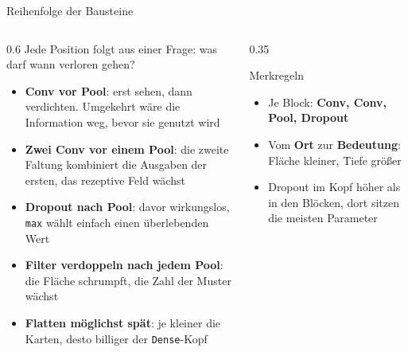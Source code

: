 \begin{frame}{Reihenfolge der Bausteine}
\footnotesize
\begin{columns}
\begin{column}{0.6\linewidth}
Jede Position folgt aus einer Frage: was darf wann verloren gehen?
\begin{itemize}
  \item \textbf{Conv vor Pool}: erst sehen, dann verdichten. Umgekehrt wäre die Information weg, bevor sie genutzt wird
  \item \textbf{Zwei Conv vor einem Pool}: die zweite Faltung kombiniert die Ausgaben der ersten, das rezeptive Feld wächst
  \item \textbf{Dropout nach Pool}: davor wirkungslos, \texttt{max} wählt einfach einen überlebenden Wert
  \item \textbf{Filter verdoppeln nach jedem Pool}: die Fläche schrumpft, die Zahl der Muster wächst
  \item \textbf{Flatten möglichst spät}: je kleiner die Karten, desto billiger der \texttt{Dense}-Kopf
\end{itemize}
\end{column}
\begin{column}{0.35\linewidth}
\begin{blockC2}{\footnotesize Merkregeln}
\begin{itemize}
  \item Je Block: \textbf{Conv, Conv, Pool, Dropout}
  \item Vom \textbf{Ort} zur \textbf{Bedeutung}: Fläche kleiner, Tiefe größer
  \item Dropout im Kopf höher als in den Blöcken, dort sitzen die meisten Parameter
\end{itemize}
\end{blockC2}
\end{column}
\end{columns}
\end{frame}

